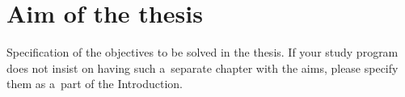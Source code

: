 \chapter*{Aim of the thesis}
{}

Specification of the objectives to be solved in the thesis.
If your study program does not insist on having such a~separate chapter with the aims,
please specify them as a~part of the Introduction.